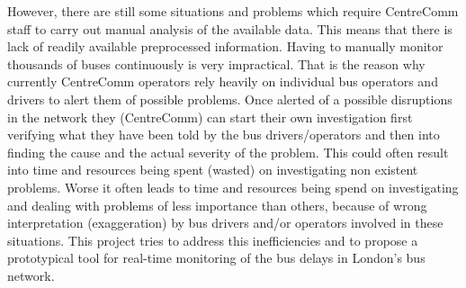However, there are still some situations and problems which require CentreComm staff to carry out manual analysis of the available data. This means that there is lack of readily available preprocessed information. Having to manually monitor thousands of buses continuously is very impractical. That is the reason why currently CentreComm operators rely heavily on individual bus operators and drivers to alert them of possible problems. Once alerted of a possible disruptions in the network they (CentreComm) can start their own investigation first verifying what they have been told by the bus drivers/operators and then into finding the cause and the actual severity of the problem. This could often result into time and resources being spent (wasted) on investigating non existent problems. Worse it often leads to time and resources being spend on investigating and dealing with problems of less importance than others, because of wrong interpretation (exaggeration) by bus drivers and/or operators involved in these situations. This project tries to address this inefficiencies and to propose a prototypical tool for real-time monitoring of the bus delays in London's bus network.


